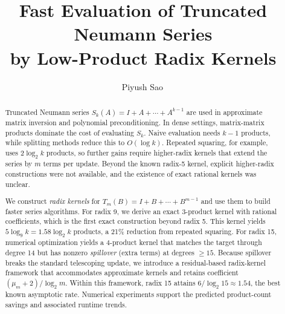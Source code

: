\documentclass[
  journal=largetwo,
  manuscript=article,
  manuscriptlabel={Research Preprint},
  logo=false,
  simfonts=false,
  year=2026,
  volume=1,
]{cup-journal}
\title{Fast Evaluation of Truncated Neumann Series\\
  by Low-Product Radix Kernels}
\author{Piyush Sao\,\orcidlink{0000-0002-9432-5855}}
\affiliation{Oak Ridge National Laboratory, Oak Ridge, TN, USA}
\theoremstyle{definition}
\theoremstyle{remark}
\begin{document}
\begin{abstract}

Truncated Neumann series $S_k(A)=I+A+\cdots+A^{k-1}$ are used in approximate
matrix inversion and polynomial preconditioning.
In dense settings, matrix-matrix products dominate the cost of evaluating $S_k$.
Naive evaluation needs $k-1$ products, while splitting methods reduce this to
$O(\log k)$.
Repeated squaring, for example, uses $2\log_2 k$ products, so further gains
require higher-radix kernels that extend the series by $m$ terms per update.
Beyond the known radix-5 kernel, explicit higher-radix constructions were not
available, and the existence of exact rational kernels was unclear.

We construct \emph{radix kernels} for $T_m(B)=I+B+\cdots+B^{m-1}$ and use them
to build faster series algorithms.
For radix 9, we derive an exact 3-product kernel with rational coefficients,
which is the first exact construction beyond radix 5.
This kernel yields $5\log_9 k=1.58\log_2 k$ products, a 21\% reduction from
repeated squaring.
For radix 15, numerical optimization yields a 4-product kernel that matches the
target through degree 14 but has nonzero \emph{spillover} (extra terms) at
degrees $\ge 15$.
Because spillover breaks the standard telescoping update, we introduce a
residual-based radix-kernel framework that accommodates approximate kernels and
retains coefficient $(\mu_m+2)/\log_2 m$.
Within this framework, radix 15 attains $6/\log_2 15\approx 1.54$, the best
known asymptotic rate.
Numerical experiments support the predicted product-count savings and associated
runtime trends.

\end{abstract}

{%
\renewcommand{\thefootnote}{\fnsymbol{footnote}}%
%
}
\end{document}
